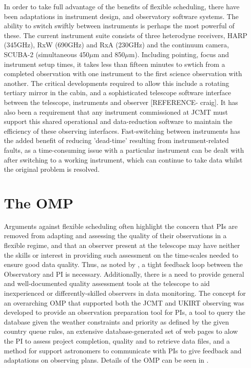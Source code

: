 \documentclass[]{spie}  %
\begin{document}
In order to take full advantage of the benefits of flexible
scheduling, there have been adaptations in instrument design, and
observatory software systems. The ability to switch swiftly between
instruments is perhaps the most powerful of these. The current
instrument suite consists of three heterodyne receivers, HARP
(345GHz), RxW (690GHz) and RxA (230GHz) and the continuum camera,
SCUBA-2 (simultaneous 450$\mu$m and 850$\mu$m). Including pointing,
focus and instrument setup times, it takes less than fifteen minutes
to swtich from a completed observation with one instrument to the
first science observation with another. The critical developments
required to allow this include a rotating tertiary mirror in the
cabin, and a sophisticated telescope software interface between the
telescope, instruments and observer [REFERENCE- craig]. It has also
been a requirement that any instrument commissioned at JCMT must
support this shared operational and data-reduction software to
maintain the efficiency of these observing interfaces. Fast-switching
between instruments has the added benefit of reducing 'dead-time'
resulting from instrument-related faults, as a time-consuming issue
with a particular instrument can be dealt with after switching to a
working instrument, which can continue to take data whilst the
original problem is resolved.



\section{The OMP}\label{sec:omp}

Arguments against flexible scheduling often highlight the concern that
PIs are removed from adapting and assessing the quality of their
observations in a flexible regime, and that an observer present at the
telescope may have neither the skills or interest in providing such
assessment on the time-scales needed to ensure good data
quality. Thus, as noted by \cite{tilanus2000}, a tight feedback loop
between the Observatory and PI is necessary. Additionally, there is a
need to provide general and well-documented quality assessment tools
at the telescope to aid inexperienced or differently-skilled observers
in data monitoring. The concept for an overarching OMP that supported
both the JCMT and UKIRT observing was developed to provide an
observation preparation tool for PIs, a tool to query the database
given the weather constraints and priority as defined by the given
country queue rules, an extensive database-generated set of web pages
to alow the PI to assess project completion, quality and to retrieve
data files, and a method for support astronomers to communicate with
PIs to give feedback and adaptations on observing plans. Details of
the OMP can be seen in \cite{2011tfa..confE..42J}.
\end{document}
